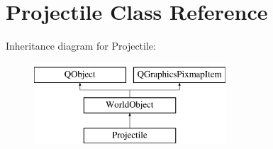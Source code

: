 \hypertarget{class_projectile}{}\section{Projectile Class Reference}
\label{class_projectile}
Inheritance diagram for Projectile\+:\begin{figure}[H]
\begin{center}
\leavevmode
\includegraphics[height=3.000000cm]{class_projectile}
\end{center}
\end{figure}
